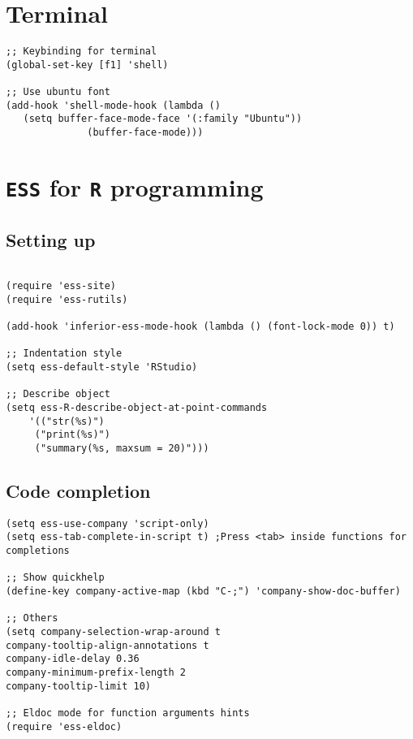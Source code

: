 \documentclass[11pt]{article}
\begin{document}
\section{Terminal}
\label{sec:org20f80e2}
\begin{verbatim}
;; Keybinding for terminal
(global-set-key [f1] 'shell)

;; Use ubuntu font
(add-hook 'shell-mode-hook (lambda ()   
   (setq buffer-face-mode-face '(:family "Ubuntu"))
			  (buffer-face-mode)))

\end{verbatim}
\section{\texttt{ESS} for \texttt{R} programming}
\label{sec:org6cbb8af}
\subsection{Setting up}
\label{sec:orgfe4900a}
\begin{verbatim}

(require 'ess-site)
(require 'ess-rutils)

(add-hook 'inferior-ess-mode-hook (lambda () (font-lock-mode 0)) t)

;; Indentation style
(setq ess-default-style 'RStudio)

;; Describe object
(setq ess-R-describe-object-at-point-commands
    '(("str(%s)")
     ("print(%s)")
     ("summary(%s, maxsum = 20)")))

\end{verbatim}

\subsection{Code completion}
\label{sec:org79106ff}
\begin{verbatim}
(setq ess-use-company 'script-only)
(setq ess-tab-complete-in-script t)	;Press <tab> inside functions for completions

;; Show quickhelp
(define-key company-active-map (kbd "C-;") 'company-show-doc-buffer)

;; Others
(setq company-selection-wrap-around t
company-tooltip-align-annotations t
company-idle-delay 0.36
company-minimum-prefix-length 2
company-tooltip-limit 10)

;; Eldoc mode for function arguments hints
(require 'ess-eldoc)


\end{verbatim}
\end{document}
